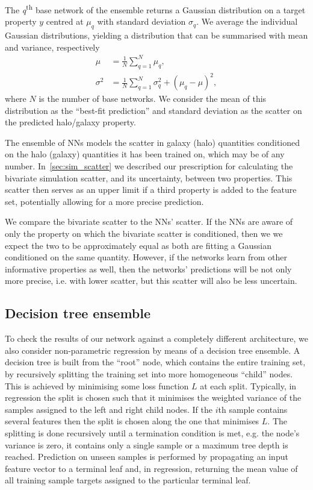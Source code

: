 \documentclass[useAMS,usenatbib]{mnras}
\begin{document}
The {\it q}\textsuperscript{th} base network of the ensemble returns a Gaussian distribution on a target property $y$ centred at $\mu_q$ with standard deviation $\sigma_q$. We average the individual Gaussian distributions, yielding a distribution that can be summarised with mean and variance, respectively
\begin{subequations}\label{eq:Combine NN}
    \begin{align}
        \mu &= \frac{1}{N} \sum_{q=1}^{N} \mu_q,\\
        \sigma^2 &= \frac{1}{N} \sum_{q=1}^{N}\sigma_q^2 + \left(\mu_q - \mu\right)^2,
    \end{align}
\end{subequations}
where $N$ is the number of base networks. We consider the mean of this distribution as the ``best-fit prediction'' and standard deviation as the scatter on the predicted halo/galaxy property.

The ensemble of \acp{NN} models the scatter in galaxy (halo) quantities conditioned on the halo (galaxy) quantities it has been trained on, which may be of any number. In~\cref{sec:sim_scatter} we described our prescription for calculating the bivariate simulation scatter, and its uncertainty, between two properties. This scatter then serves as an upper limit if a third property is added to the feature set, potentially allowing for a more precise prediction.

We compare the bivariate scatter to the \acp{NN}' scatter. If the \acp{NN} are aware of only the property on which the bivariate scatter is conditioned, then we we expect the two to be approximately equal as both are fitting a Gaussian conditioned on the same quantity. However, if the networks learn from other informative properties as well, then the networks' predictions will be not only more precise, i.e. with lower scatter, but this scatter will also be less uncertain.


\subsection{Decision tree ensemble}\label{sec:decision_trees}

To check the results of our network against a completely different architecture, we also consider non-parametric regression by means of a decision tree ensemble. A decision tree is built from the ``root'' node, which contains the entire training set, by recursively splitting the training set into more homogeneous ``child'' nodes. This is achieved by minimising some loss function $L$ at each split. Typically, in regression the split is chosen such that it minimises the weighted variance of the samples assigned to the left and right child nodes. If the $i$th sample contains several features then the split is chosen along the one that minimises $L$. The splitting is done recursively until a termination condition is met, e.g. the node's variance is zero, it contains only a single sample or a maximum tree depth is reached. Prediction on unseen samples is performed by propagating an input feature vector to a terminal leaf and, in regression, returning the mean value of all training sample targets assigned to the particular terminal leaf.
\end{document}
